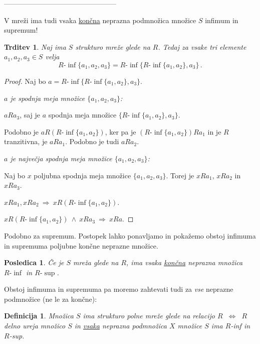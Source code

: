 \documentclass[11pt,paper=b5,footinclude,headinclude]{scrbook} %
\def\inn {{~\wedge~}}
\def\sledi {{~\Rightarrow~}}
\def\cee {{~\Leftrightarrow~}}
\newtheorem*{trditev}{Trditev}
\newtheorem*{posledica}{Posledica}
\newtheorem*{definicija}{Definicija}
\begin{document}
------------------------------------------------

\bigskip

V mreži ima tudi vsaka \underline{končna} neprazna podmnožica množice $S$ infimum in supremum!

\begin{trditev}
Naj ima $S$ strukturo mreže glede na $R$. Tedaj za vsake tri elemente $a_1,a_2,a_3\in S$ velja
$$R\textrm{-}\inf\{a_1,a_2,a_3\} = R\textrm{-}\inf\{R\textrm{-}\inf\{a_1,a_2\}, a_3\}\,.$$
\end{trditev}

\begin{proof}
Naj bo $a = R\textrm{-}\inf\{R\textrm{-}\inf\{a_1,a_2\}, a_3\}$.

\emph{ $a$ je spodnja meja množice $\{a_1,a_2,a_3\}$:}

  $aRa_3$, saj je $a$ spodnja meja množice $\{R\textrm{-}\inf\{a_1,a_2\}, a_3\}$.

  Podobno je
  $aR(R\textrm{-}\inf\{a_1,a_2\})$, ker pa je $(R\textrm{-}\inf\{a_1,a_2\})Ra_1$ in je $R$ tranzitivna, je $aRa_1$. Podobno je tudi $aRa_2$.


\emph{ $a$ je največja spodnja meja množice $\{a_1,a_2,a_3\}$:}

Naj bo $x$ poljubna spodnja meja množice $\{a_1,a_2,a_3\}$. Torej je $xRa_1$, $xRa_2$ in $xRa_3$.

$xRa_1, xRa_2\sledi xR(R\textrm{-}\inf\{a_1,a_2\})$.

$xR(R\textrm{-}\inf\{a_1,a_2\}) \inn xRa_3\sledi xRa$.
\end{proof}

Podobno za supremum. Postopek lahko ponavljamo in
pokažemo obstoj infimuma in supremuma poljubne končne neprazne množice.

\medskip
%

\begin{posledica}
Če je $S$ mreža glede na $R$, ima vsaka \underline{končna} neprazna množica $R\textrm{-}\inf$
in $R\textrm{-}\sup$.
\end{posledica}

Obstoj infimuma in supremuma pa moremo zahtevati tudi za \emph{ vse} neprazne podmnožice (ne le za končne):

\begin{definicija}
Množica $S$ ima strukturo {\em polne mreže} glede na relacijo $R$ $\cee$
$R$ delno ureja množico $S$ in \underline{vsaka} neprazna podmnožica $X$ množice $S$ ima $R$-inf in $R$-sup.
\end{definicija}
\end{document}
